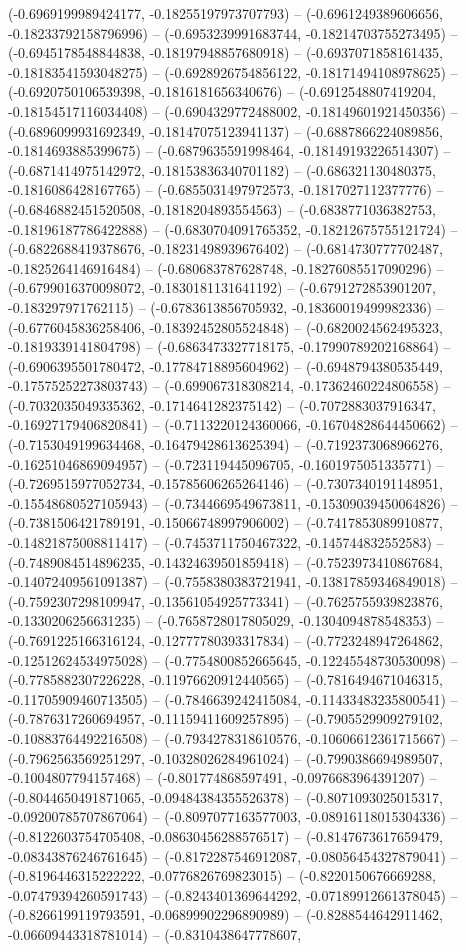 (-0.6969199989424177, -0.18255197973707793) -- (-0.6961249389606656, -0.18233792158796996) -- (-0.6953239991683744, -0.18214703755273495) -- (-0.6945178548844838, -0.18197948857680918) -- (-0.6937071858161435, -0.18183541593048275) -- (-0.6928926754856122, -0.18171494108978625) -- (-0.6920750106539398, -0.1816181656340676) -- (-0.6912548807419204, -0.18154517116034408) -- (-0.6904329772488002, -0.18149601921450356) -- (-0.6896099931692349, -0.18147075123941137) -- (-0.6887866224089856, -0.1814693885399675) -- (-0.6879635591998464, -0.18149193226514307) -- (-0.6871414975142972, -0.18153836340701182) -- (-0.686321130480375, -0.1816086428167765) -- (-0.6855031497972573, -0.1817027112377776) -- (-0.6846882451520508, -0.1818204893554563) -- (-0.6838771036382753, -0.18196187786422888) -- (-0.6830704091765352, -0.18212675755121724) -- (-0.6822688419378676, -0.18231498939676402) -- (-0.6814730777702487, -0.1825264146916484) -- (-0.680683787628748, -0.18276085517090296) -- (-0.6799016370098072, -0.1830181131641192) -- (-0.6791272853901207, -0.183297971762115) -- (-0.6783613856705932, -0.18360019499982336) -- (-0.6776045836258406, -0.18392452805524848) -- (-0.6820024562495323, -0.1819339141804798) -- (-0.6863473327718175, -0.17990789202168864) -- (-0.6906395501780472, -0.17784718895604962) -- (-0.6948794380535449, -0.17575252273803743) -- (-0.699067318308214, -0.17362460224806558) -- (-0.7032035049335362, -0.1714641282375142) -- (-0.7072883037916347, -0.16927179406820841) -- (-0.7113220124360066, -0.16704828644450662) -- (-0.7153049199634468, -0.16479428613625394) -- (-0.7192373068966276, -0.16251046869094957) -- (-0.723119445096705, -0.1601975051335771) -- (-0.7269515977052734, -0.15785606265264146) -- (-0.7307340191148951, -0.15548680527105943) -- (-0.7344669549673811, -0.15309039450064826) -- (-0.7381506421789191, -0.15066748997906002) -- (-0.7417853089910877, -0.14821875008811417) -- (-0.7453711750467322, -0.145744832552583) -- (-0.7489084514896235, -0.14324639501859418) -- (-0.7523973410867684, -0.14072409561091387) -- (-0.7558380383721941, -0.13817859346849018) -- (-0.7592307298109947, -0.13561054925773341) -- (-0.7625755939823876, -0.1330206256631235) -- (-0.7658728017805029, -0.1304094878548353) -- (-0.7691225166316124, -0.12777780393317834) -- (-0.7723248947264862, -0.12512624534975028) -- (-0.7754800852665645, -0.12245548730530098) -- (-0.7785882307226228, -0.11976620912440565) -- (-0.7816494671046315, -0.11705909460713505) -- (-0.7846639242415084, -0.11433483235800541) -- (-0.7876317260694957, -0.11159411609257895) -- (-0.7905529909279102, -0.10883764492216508) -- (-0.7934278318610576, -0.10606612361715667) -- (-0.7962563569251297, -0.10328026284961024) -- (-0.7990386694989507, -0.1004807794157468) -- (-0.801774868597491, -0.0976683964391207) -- (-0.8044650491871065, -0.09484384355526378) -- (-0.8071093025015317, -0.09200785707867064) -- (-0.8097077163577003, -0.08916118015304336) -- (-0.8122603754705408, -0.08630456288576517) -- (-0.8147673617659479, -0.08343876246761645) -- (-0.8172287546912087, -0.08056454327879041) -- (-0.8196446315222222, -0.0776826769823015) -- (-0.8220150676669288, -0.07479394260591743) -- (-0.8243401369644292, -0.07189912661378045) -- (-0.8266199119793591, -0.06899902296890989) -- (-0.8288544642911462, -0.06609443318781014) -- (-0.8310438647778607, 